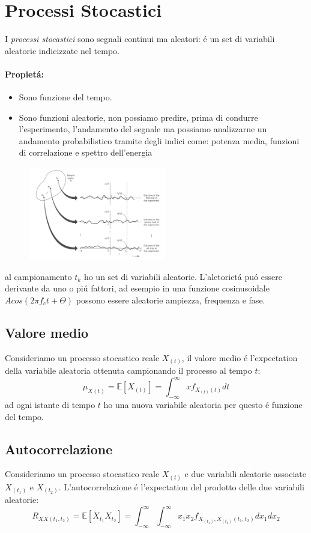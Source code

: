 \section{Processi Stocastici}
    I \emph{processi stocastici} sono segnali continui ma aleatori: é un set di variabili aleatorie indicizzate nel tempo.
    \paragraph{Propietá:}
        \begin{itemize}
            \item {Sono funzione del tempo.}
            \item {Sono funzioni aleatorie, non possiamo predire, prima di condurre l'esperimento, l'andamento del segnale ma 
            possiamo analizzarne un andamento probabilistico tramite degli indici come: potenza media, funzioni di correlazione e spettro dell'energia}
        \end{itemize} 
        \begin{figure}[H]
            \centering
            \includegraphics[width = 6cm]{media/processi stocastici.png}
        \end{figure}
        al campionamento $t_k$ ho un set di variabili aleatorie. L'aletorietá puó essere derivante da uno o piú fattori,
        ad esempio in una funzione cosinusoidale $Acos(2\pi f_ct+\Theta)$ possono essere aleatorie ampiezza, frequenza e fase.

    \subsection{Valore medio}
        Consideriamo un processo stocastico reale $X_{(t)}$, il valore medio é l'expectation della variabile aleatoria ottenuta campionando
        il processo al tempo $t$:
            \[
                \mu_{X(t)} = \mathbb{E}[X_{(t)}] = \int_{-\infty}^{\infty}xf_{X_{(t)}(t)}dt
            \]
        ad ogni istante di tempo $t$ ho una nuova variabile aleatoria per questo é funzione del tempo.
    \subsection{Autocorrelazione}
        Consideriamo un processo stocastico reale $X_{(t)}$ e due variabili aleatorie associate $X_{(t_1)}$ e $X_{(t_2)}$. 
        L'autocorrelazione é l'expectation del prodotto delle due variabili aleatorie:
        \[
            R_{XX(t_1,t_2)} = \mathbb{E}[X_{t_1}X_{t_2}] = \int_{-\infty}^{\infty}\int_{-\infty}^{\infty} x_1x_2f_{X_{(t_1)},X_{(t_2)}(t_1,t_2)}dx_1dx_2
        \]
